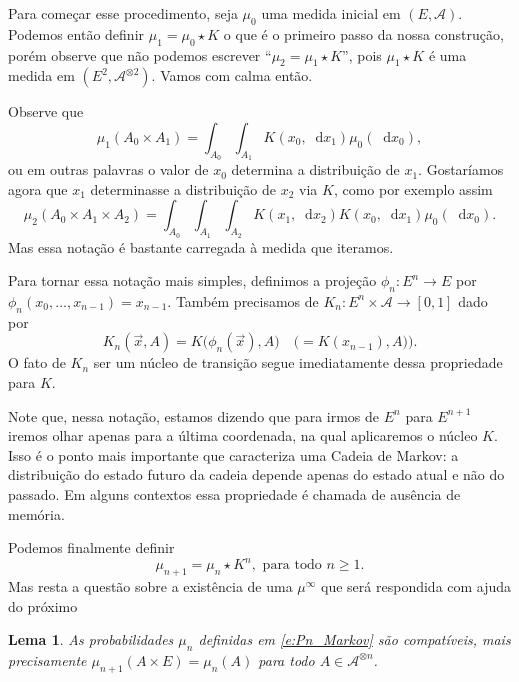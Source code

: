\documentclass[reqno, final]{book}
\newcommand*\1{\mathds{1}}
\newtheorem{lemma}[theorem]{Lema}
\renewcommand*\d{\mathop{}\!\mathrm{d}}
\begin{document}
Para começar esse procedimento, seja $\mu_0$ uma medida inicial em $(E, \mathcal{A})$.
Podemos então definir $\mu_1 = \mu_0 \star K$ o que é o primeiro passo da nossa construção, porém observe que não podemos escrever ``$\mu_2 = \mu_1 \star K$'', pois $\mu_1 \star K$ é uma medida em $(E^2, \mathcal{A}^{\otimes 2})$.
Vamos com calma então.

Observe que
\begin{equation}
  \mu_1(A_0 \times A_1) = \int_{A_0} \int_{A_1} K(x_0, \d x_1) \mu_0(\d x_0),
\end{equation}
ou em outras palavras o valor de $x_0$ determina a distribuição de $x_1$.
Gostaríamos agora que $x_1$ determinasse a distribuição de $x_2$ via $K$, como por exemplo assim
\begin{equation}
  \mu_2(A_0 \times A_1 \times A_2) = \int_{A_0} \int_{A_1} \int_{A_2} K(x_1, \d x_2) K(x_0, \d x_1) \mu_0 (\d x_0).
\end{equation}
Mas essa notação é bastante carregada à medida que iteramos.

Para tornar essa notação mais simples, definimos a projeção $\phi_n:E^n \to E$ por $\phi_n(x_0, \dots, x_{n-1}) = x_{n-1}$.
Também precisamos de $K_n: E^n \times \mathcal{A} \to [0,1]$ dado por
\begin{equation}
  K_n(\vec{x},A) = K\big(\phi_n(\vec{x}), A\big) \quad \big(= K(x_{n-1}),A) \big).
\end{equation}
O fato de $K_n$ ser um núcleo de transição segue imediatamente dessa propriedade para $K$.

Note que, nessa notação, estamos dizendo que para irmos de $E^n$ para $E^{n+1}$ iremos olhar apenas para a última coordenada, na qual aplicaremos o núcleo $K$.
Isso é o ponto mais importante que caracteriza uma Cadeia de Markov: a distribuição do estado futuro da cadeia depende apenas do estado atual e não do passado.
Em alguns contextos essa propriedade é chamada de ausência de memória.

Podemos finalmente definir
\begin{equation}
  \label{e:Pn_Markov}
  \mu_{n+1} = \mu_n \star K^n, \text{ para todo $n \geq 1$}.
\end{equation}
Mas resta a questão sobre a existência de uma $\mu^\infty$ que será respondida com ajuda do próximo

\begin{lemma}
  As probabilidades $\mu_n$ definidas em \eqref{e:Pn_Markov} são compatíveis, mais precisamente $\mu_{n+1}(A \times E) = \mu_n(A)$ para todo $A \in \mathcal{A}^{\otimes n}$.
\end{lemma}
\end{document}
